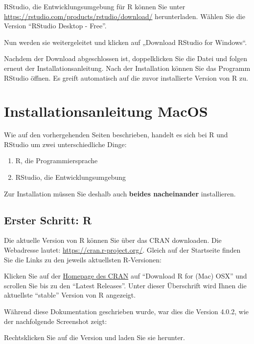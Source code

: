 \documentclass[
]{book}
\begin{document}
RStudio, die Entwicklungsumgebung für R können Sie unter \url{https://rstudio.com/products/rstudio/download/} herunterladen.
Wählen Sie die Version ``RStudio Desktop - Free''.

Nun werden sie weitergeleitet und klicken auf „Download RStudio for Windows``.

Nachdem der Download abgeschlossen ist, doppelklicken Sie die Datei und folgen erneut der Installationsanleitung. Nach der Installation können Sie das Programm RStudio öffnen. Es greift automatisch auf die zuvor installierte Version von R zu.

\hypertarget{installationsanleitung-macos}{%
\section{Installationsanleitung MacOS}\label{installationsanleitung-macos}}

Wie auf den vorhergehenden Seiten beschrieben, handelt es sich bei R und RStudio um zwei unterschiedliche Dinge:

\begin{enumerate}
\def\labelenumi{\arabic{enumi}.}
\item
  R, die Programmiersprache
\item
  RStudio, die Entwicklungsumgebung
\end{enumerate}

Zur Installation müssen Sie deshalb auch \textbf{beides nacheinander} installieren.

\hypertarget{erster-schritt-r-1}{%
\subsection{Erster Schritt: R}\label{erster-schritt-r-1}}

Die aktuelle Version von R können Sie über das CRAN downloaden. Die Webadresse lautet: \href{https://cran.r-project.org}{https://cran.r-project.org/}. Gleich auf der Startseite finden Sie die Links zu den jeweils aktuellsten R-Versionen:

Klicken Sie auf der \href{https://cran.r-project.org}{Homepage des CRAN} auf ``Download R for (Mac) OSX'' und scrollen Sie bis zu den ``Latest Releases''. Unter dieser Überschrift wird Ihnen die aktuellste ``stable'' Version von R angezeigt.

Während diese Dokumentation geschrieben wurde, war dies die Version 4.0.2, wie der nachfolgende Screenshot zeigt:

Rechtsklicken Sie auf die Version und laden Sie sie herunter.
\end{document}
